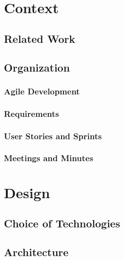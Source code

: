 \documentclass{l4proj}
\begin{document}
\chapter{Context}

\section{Related Work}


\section{Organization}


\subsection{Agile Development}


\subsection{Requirements}


\subsection{User Stories and Sprints}


\subsection{Meetings and Minutes}


\chapter{Design}

\section{Choice of Technologies}



\section{Architecture}

\end{document}

